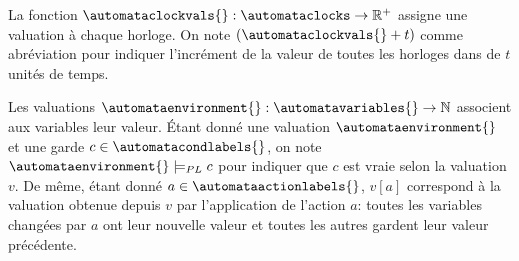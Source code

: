 \begin{definition}
La fonction
$\automataclockvals{}: \automataclocks \to \mathbb{R}^+$ assigne une valuation
à chaque horloge. On note $(\automataclockvals{} + t)$ comme abréviation pour
indiquer l'incrément de la valeur de toutes les horloges dans \automataclockvals{}
de $t$ unités de temps.
\end{definition}

\begin{definition}
  Les valuations
$\automataenvironment{}:\automatavariables{} \to \mathbb{N}$
  associent aux variables leur valeur.
Étant donné une valuation $\automataenvironment{}$ et une garde
$c \in \automatacondlabels{}$, on note $\automataenvironment{} \models_{PL} c$
pour indiquer que $c$ est vraie selon la valuation $v$.
De même, étant donné $a \in \automataactionlabels{}$, $v[a]$ correspond à la
valuation obtenue depuis $v$ par l'application de l'action $a$: toutes les
variables changées par $a$ ont leur nouvelle valeur et toutes les autres gardent
leur valeur précédente.
\end{definition}


